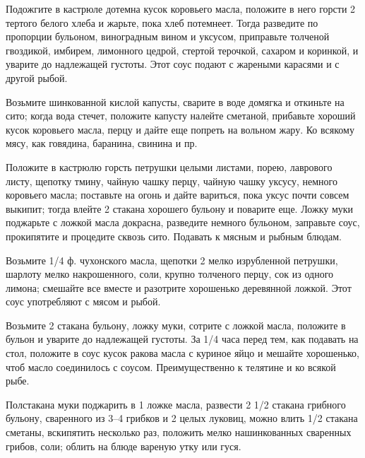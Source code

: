 Подожгите в кастрюле дотемна кусок коровьего масла, положите в него горсти 2 тертого белого хлеба и жарьте, пока хлеб потемнеет. Тогда разведите по пропорции бульоном, виноградным вином и уксусом, приправьте толченой гвоздикой, имбирем, лимонного цедрой, стертой терочкой, сахаром и коринкой, и уварите до надлежащей густоты. Этот соус подают с жареными карасями и с другой рыбой. 


Возьмите шинкованной кислой капусты, сварите в воде домягка и откиньте на сито; когда вода стечет, положите капусту налейте сметаной, прибавьте хороший кусок коровьего масла, перцу и дайте еще попреть на вольном жару. Ко всякому мясу, как говядина, баранина, свинина и пр.


Положите в кастрюлю горсть петрушки целыми листами, порею, лаврового листу, щепотку тмину, чайную чашку перцу, чайную чашку уксусу, немного коровьего масла; поставьте на огонь и дайте вариться, пока уксус почти совсем выкипит; тогда влейте 2 стакана хорошего бульону и поварите еще. Ложку муки поджарьте с ложкой масла докрасна, разведите немного бульоном, заправьте соус, прокипятите и процедите сквозь сито. Подавать к мясным и рыбным блюдам. 


Возьмите 1/4 ф. чухонского масла, щепотки 2 мелко изрубленной петрушки, шарлоту мелко накрошенного, соли, крупно толченого перцу, сок из одного лимона; смешайте все вместе и разотрите хорошенько деревянной ложкой. Этот соус употребляют с мясом и рыбой. 


Возьмите 2 стакана бульону, ложку муки, сотрите с ложкой масла, положите в бульон и уварите до надлежащей густоты. За 1/4 часа перед тем, как подавать на стол, положите в соус кусок ракова масла с куриное яйцо и мешайте хорошенько, чтоб масло соединилось с соусом. Преимущественно к телятине и ко всякой рыбе. 


Полстакана муки поджарить в 1 ложке масла, развести 2 1/2 стакана грибного бульону, сваренного из 3--4 грибков и 2 целых луковиц, можно влить 1/2 стакана сметаны, вскипятить несколько раз, положить мелко нашинкованных сваренных грибов, соли; облить на блюде вареную утку или гуся.


